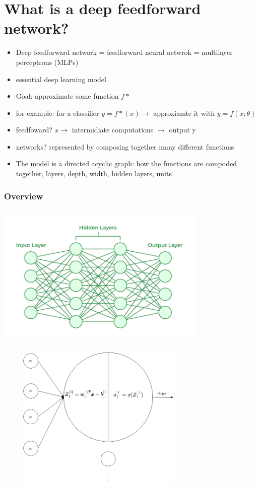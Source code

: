 \documentclass{beamer}
\begin{document}
\section{What is a deep feedforward network?}
\begin{frame}
\begin{itemize}
	\item Deep feedforward network = feedforward neural netwrok = multilayer perceptrons (MLPs)
	\item essential deep learning model
	\item Goal: approximate some function $f\ast$
	\item for example: for a classifier $y = f*(x) \rightarrow$ approxiamte it with $y = f(x;\theta)$
	\item feedfoward? $x \rightarrow$ intermidiate computations $\rightarrow $ output y
	\item networks? represented by composing together many different functions
	\item The model is a directed acyclic graph: how the functions are compoded together, layers, depth, width, hidden layers, units
\end{itemize}
\end{frame}
\begin{frame}
	\frametitle{Overview}
	\center
	\includegraphics[width= 100mm, height = 70mm]{Neural-Networks-Architecture.png}
\end{frame}
\begin{frame}
	\center
	\includegraphics[width = 100mm, height= 70mm]{single_neuron.png}
\end{frame}
\end{document}
